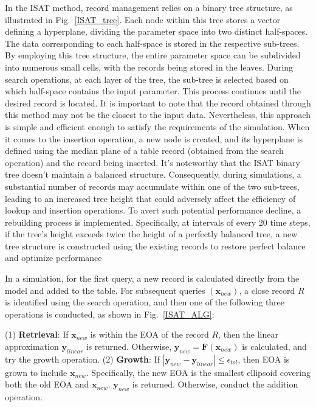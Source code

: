 In the ISAT method, record management relies on a binary tree structure,  as illustrated in Fig.~\ref{ISAT_tree}. Each node within this tree stores a vector defining a hyperplane, dividing the parameter space into two distinct half-spaces. The data corresponding to each half-space is stored in the respective sub-trees. By employing this tree structure, the entire parameter space can be subdivided into numerous small cells, with the records being stored in the leaves. During search operations, at each layer of the tree, the sub-tree is selected based on which half-space contains the input parameter. This process continues until the desired record is located. It is important to note that the record obtained through this method may not be the closest to the input data. Nevertheless, this approach is simple and efficient enough to satisfy the requirements of the simulation. When it comes to the insertion operation, a new node is created, and its hyperplane is defined using the median plane of a table record (obtained from the search operation) and the record being inserted. It's noteworthy that the ISAT binary tree doesn't maintain a balanced structure. Consequently, during simulations, a substantial number of records may accumulate within one of the two sub-trees, leading to an increased tree height that could adversely affect the efficiency of lookup and insertion operations. To avert such potential performance decline, a rebuilding process is implemented. Specifically, at intervals of every 20 time steps, if the tree's height exceeds twice the height of a perfectly balanced tree, a new tree structure is constructed using the existing records to restore perfect balance and optimize performance


In a simulation, for the first query, a new record is calculated directly from the model and added to the table.
For subsequent queries $(\mathbf{x}_{new})$, a close record $R$%
is identified using the search operation, and then one of the following three operations is conducted, as shown in Fig.~\ref{ISAT_ALG}:

(1) \textbf{Retrieval}: If $\mathbf{x}_{new}$ is within the EOA of the record $R$, then the linear approximation $\mathbf{y}_{linear}$ is returned. Otherwise, $\mathbf{y}_{new}=\mathbf{F}\left(\mathbf{x}_{new}\right)$ is calculated, and try the growth
operation.
(2) \textbf{Growth}: If $\left|\mathbf{y}_{new}- \mathbf{y}_{linear}\right|\leq\epsilon_{tol}$, then EOA is grown to include $\mathbf{x}_{new}$. Specifically, the new EOA is the smallest ellipsoid covering both the old EOA and $\mathbf{x}_{new}$. $\mathbf{y}_{new}$ is returned. Otherwise, conduct the addition operation.

